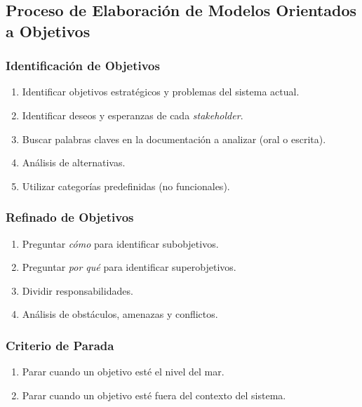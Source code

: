 \documentclass[handout,slidestop,xcolor=pst,dvips,blue]{beamer}
\begin{document}

\subsection[Proceso de Modelado de Objetivos]{Proceso de Elaboración de Modelos Orientados a Objetivos}

\begin{frame}[c]
    \frametitle{Identificación de Objetivos}
    \begin{enumerate}[<+->]
         \item Identificar objetivos estratégicos y problemas del sistema actual.
         \item Identificar deseos y esperanzas de cada \emph{stakeholder}.
         \item Buscar palabras claves en la documentación a analizar (oral o escrita).
         \item Análisis de alternativas.
         \item Utilizar categorías predefinidas (no funcionales).
    \end{enumerate}
\end{frame}

\begin{frame}[c]
    \frametitle{Refinado de Objetivos}
    \begin{enumerate}[<+->]
         \item Preguntar \emph{cómo} para identificar subobjetivos.
         \item Preguntar \emph{por qué} para identificar superobjetivos.
         \item Dividir responsabilidades.
         \item Análisis de obstáculos, amenazas y conflictos.
    \end{enumerate}
\end{frame}

\begin{frame}[c]
    \frametitle{Criterio de Parada}
    \begin{enumerate}[<+->]
         \item Parar cuando un objetivo esté el nivel del mar.
         \item Parar cuando un objetivo esté fuera del contexto del sistema.
    \end{enumerate}
\end{frame}
\end{document}
